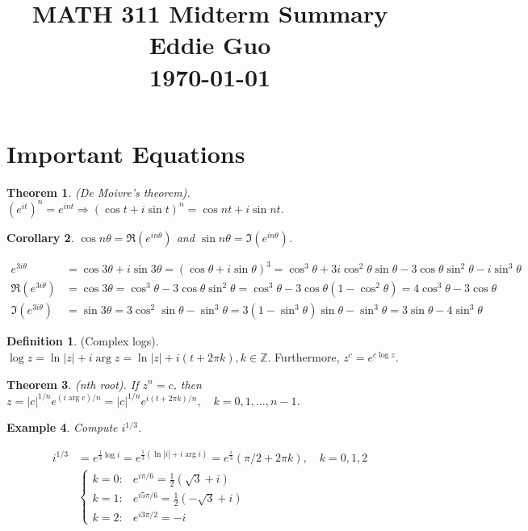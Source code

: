 \documentclass{article}
\title{\LARGE MATH 311 Midterm Summary \\[1em] \normalsize Eddie Guo \\ \today}
\author{}
\date{}
\newtheorem{theorem}{Theorem}[section]
\newtheorem{corollary}[theorem]{Corollary}
\newtheorem{example}[theorem]{Example}
\theoremstyle{definition}
\newtheorem{definition}{Definition}[section]
\begin{document}
\maketitle
\vspace{-5em}

\section{Important Equations}

\begin{theorem} \normalfont
    (De Moivre's theorem). $(e^{it})^n = e^{int} \Longrightarrow (\cos t + i \sin t)^n = \cos nt + i \sin nt$.
\end{theorem}

\begin{corollary} \normalfont
    $\cos n \theta = \Re (e^{i n \theta})$ and $\sin n \theta = \Im (e^{i n \theta})$. \vspace{-1.5em}

\begin{align*}
        e^{3i\theta} &= \cos 3 \theta + i \sin 3 \theta = (\cos \theta + i \sin \theta)^3 = \cos^3 \theta + 3i \cos^2 \theta \sin \theta - 3 \cos \theta \sin^2 \theta - i \sin^3 \theta \\
        \Re (e^{3 i \theta}) &= \cos 3 \theta = \cos^3 \theta - 3\cos \theta \sin^2 \theta = \cos^3 \theta - 3 \cos \theta (1-\cos^2 \theta) = 4 \cos^3 \theta - 3\cos \theta \\
        \Im (e^{3 i \theta}) &= \sin 3 \theta = 3\cos^2 \sin \theta - \sin^3 \theta = 3(1 - \sin^3 \theta) \sin \theta - \sin^3 \theta = 3\sin \theta - 4 \sin^3 \theta
    \end{align*}
\end{corollary}

\begin{definition}
    (Complex logs). $\log z = \ln |z| + i \arg z = \ln |z| + i (t + 2 \pi k), k \in \mathbb{Z}$. Furthermore, $z^c = e^{c \log z}$.
\end{definition}

\begin{theorem} \normalfont
    (nth root). If $z^n = c$, then $z = |c|^{1/n} e^{(i \arg c) / n} = |c|^{1/n} e^{i(t + 2\pi k)/n}, \quad k = 0, 1, \dots, n-1$.
\end{theorem}

\begin{example} \normalfont
    Compute $i^{1/3}$. \vspace{-1em}

    \begin{align*}
        i^{1/3} &= e^{\frac{1}{3} \log i} = e^{\frac{1}{3} (\ln |i| + i \arg i)} = e^{\frac{i}{3}} (\pi/2 + 2 \pi k), \quad k = 0, 1, 2 \\
        &\begin{cases}
            k=0: & e^{i\pi/6} = \frac{1}{2} (\sqrt{3} + i) \\
            k=1: & e^{i 5\pi/6} = \frac{1}{2} (-\sqrt{3}+i) \\
            k=2: & e^{i 3\pi/2} = -i
        \end{cases}
    \end{align*}
\end{example}
\end{document}
